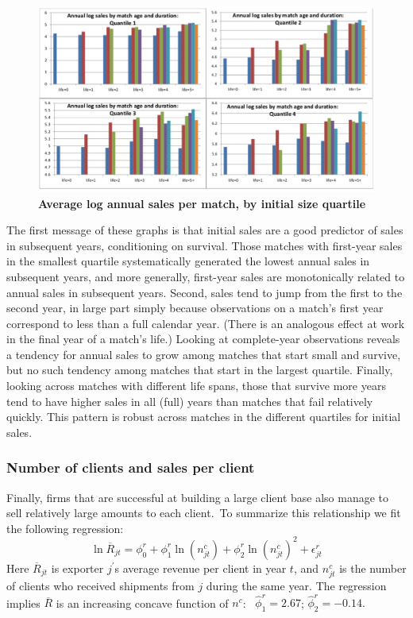 \begin{center}
\begin{figure}
    \includegraphics[width=\textwidth]{figures/figure1.pdf}
    \caption{\textbf{Average log annual sales per match, by initial size quartile}}
    \label{fig:match_maturation}
\end{figure}
\end{center}

The first message of these graphs is that initial sales are a good predictor
of sales in subsequent years, conditioning on survival. Those matches with
first-year sales in the smallest quartile systematically generated the
lowest annual sales in subsequent years, and more generally, first-year
sales are monotonically related to annual sales in subsequent years. Second,
sales tend to jump from the first to the second year, in large part simply
because observations on a match's first year correspond to less than a full
calendar year. (There is an analogous effect at work in the final year of a
match's life.) Looking at complete-year observations reveals a tendency for
annual sales to grow among matches that start small and survive, but no such
tendency among matches that start in the largest quartile. Finally, looking
across matches with different life spans, those that survive more years tend
to have higher sales in all (full) years than matches that fail relatively
quickly. This pattern is robust across matches in the different quartiles
for initial sales.

\subsubsection{Number of clients and sales per client}

Finally, firms that are successful at building a large client base also
manage to sell relatively large amounts to each client.\ To summarize this
relationship we fit the following regression:%
\begin{equation*}
\ln \overline{R}_{jt}=\phi _{0}^{r}+\phi _{1}^{r}\ln (n_{jt}^{c})+\phi
_{2}^{r}\ln (n_{jt}^{c})^{2}+\epsilon _{jt}^{r}
\end{equation*}%
Here $\overline{R}_{jt}$ is exporter $j^{\prime }$s average revenue per
client in year $t$, and $n_{jt}^{c}$ is the number of clients who received
shipments from $j$ during the same year. The regression implies $\overline{R}
$ is an increasing concave function of $n^{c}$: \ $\widehat{\phi }%
_{1}^{r}=2.67$; $\widehat{\phi }_{2}^{r}=-0.14.$


